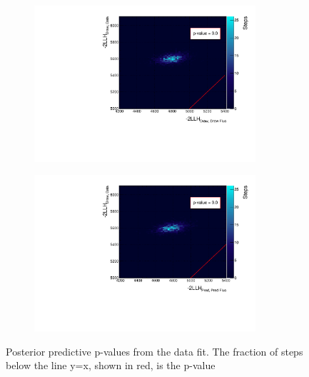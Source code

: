 \begin{figure}
\centering
\begin{subfigure}{.49\textwidth}
  \centering
	\includegraphics*[width=0.9\textwidth,clip]{figs/pval_}
\end{subfigure}
\begin{subfigure}{.49\textwidth}
  \centering
	\includegraphics*[width=0.9\textwidth,clip]{figs/pval2_}
\end{subfigure}
\caption{Posterior predictive p-values from the data fit. The fraction of steps below the line y=x, shown in red, is the p-value}\label{fig:pval}
\end{figure}


